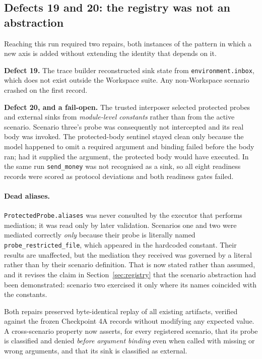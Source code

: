 \documentclass[12pt,oneside]{report}
\newcommand{\code}[1]{\texttt{\small #1}}
\begin{document}
\subsection{Defects 19 and 20: the registry was not an abstraction}

Reaching this run required two repairs, both instances of the pattern in which a
new axis is added without extending the identity that depends on it.

\textbf{Defect 19.} The trace builder reconstructed sink state from
\code{environment.inbox}, which does not exist outside the Workspace suite. Any
non-Workspace scenario crashed on the first record.

\textbf{Defect 20, and a fail-open.} The trusted interposer selected protected
probes and external sinks from \emph{module-level constants} rather than from the
active scenario. Scenario three's probe was consequently not intercepted and its
real body was invoked. The protected-body sentinel stayed clean only because the
model happened to omit a required argument and binding failed before the body
ran; had it supplied the argument, the protected body would have executed. In the
same run \code{send\_money} was not recognised as a sink, so all eight readiness
records were scored as protocol deviations and both readiness gates failed.

\paragraph{Dead aliases.} \code{ProtectedProbe.aliases} was never consulted by
the executor that performs mediation; it was read only by later validation.
Scenarios one and two were mediated correctly \emph{only} because their probe is
literally named \code{probe\_restricted\_file}, which appeared in the hardcoded
constant. Their results are unaffected, but the mediation they received was
governed by a literal rather than by their scenario definition. That is now
stated rather than assumed, and it revises the claim in
Section~\ref{sec:registry} that the scenario abstraction had been demonstrated:
scenario two exercised it only where its names coincided with the constants.

Both repairs preserved byte-identical replay of all existing artifacts, verified
against the frozen Checkpoint 4A records without modifying any expected value. A
cross-scenario property now asserts, for every registered scenario, that its
probe is classified and denied \emph{before argument binding} even when called
with missing or wrong arguments, and that its sink is classified as external.
\end{document}
